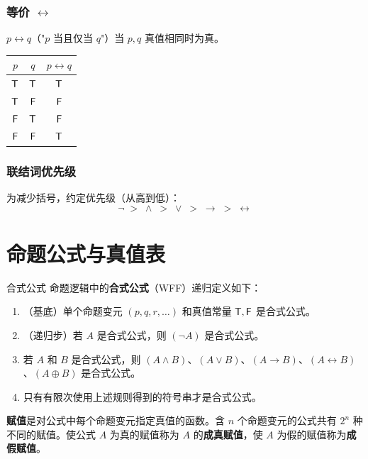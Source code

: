 \subsubsection{等价 $\leftrightarrow$}

$p \leftrightarrow q$（"$p$ 当且仅当 $q$"）当 $p,q$ 真值相同时为真。

\begin{center}
\begin{tabular}{cc|c}
\toprule
$p$ & $q$ & $p \leftrightarrow q$ \\
\midrule
$\mathsf{T}$ & $\mathsf{T}$ & $\mathsf{T}$ \\
$\mathsf{T}$ & $\mathsf{F}$ & $\mathsf{F}$ \\
$\mathsf{F}$ & $\mathsf{T}$ & $\mathsf{F}$ \\
$\mathsf{F}$ & $\mathsf{F}$ & $\mathsf{T}$ \\
\bottomrule
\end{tabular}
\end{center}

\subsubsection{联结词优先级}

为减少括号，约定优先级（从高到低）：
\[\neg \;>\; \land \;>\; \lor \;>\; \rightarrow \;>\; \leftrightarrow\]

\section{命题公式与真值表}

\begin{mydefinition}{合式公式}
命题逻辑中的\textbf{合式公式}（WFF）递归定义如下：
\begin{enumerate}
\item （基底）单个命题变元 $(p,q,r,\dots)$ 和真值常量 $\mathsf{T},\mathsf{F}$ 是合式公式。
\item （递归步）若 $A$ 是合式公式，则 $(\neg A)$ 是合式公式。
\item 若 $A$ 和 $B$ 是合式公式，则 $(A \land B)$、$(A \lor B)$、$(A \rightarrow B)$、$(A \leftrightarrow B)$、$(A \oplus B)$ 是合式公式。
\item 只有有限次使用上述规则得到的符号串才是合式公式。
\end{enumerate}
\end{mydefinition}

\textbf{赋值}是对公式中每个命题变元指定真值的函数。含 $n$ 个命题变元的公式共有 $2^n$ 种不同的赋值。使公式 $A$ 为真的赋值称为 $A$ 的\textbf{成真赋值}，使 $A$ 为假的赋值称为\textbf{成假赋值}。

